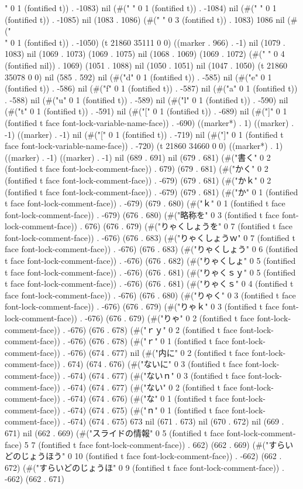 " 0 1 (fontified t)) . -1083) nil (#(" " 0 1 (fontified t)) . -1084) nil (#(" " 0 1 (fontified t)) . -1085) nil (1083 . 1086) (#("   " 0 3 (fontified t)) . 1083) 1086 nil (#("\\" 0 1 (fontified t)) . -1050) (t 21860 35111 0 0) ((marker . 966) . -1) nil (1079 . 1083) nil (1069 . 1073) (1069 . 1075) nil (1068 . 1069) (1069 . 1072) (#("    " 0 4 (fontified nil)) . 1069) (1051 . 1088) nil (1050 . 1051) nil (1047 . 1050) (t 21860 35078 0 0) nil (585 . 592) nil (#("d" 0 1 (fontified t)) . -585) nil (#("e" 0 1 (fontified t)) . -586) nil (#("f" 0 1 (fontified t)) . -587) nil (#("a" 0 1 (fontified t)) . -588) nil (#("u" 0 1 (fontified t)) . -589) nil (#("l" 0 1 (fontified t)) . -590) nil (#("t" 0 1 (fontified t)) . -591) nil (#("[" 0 1 (fontified t)) . -689) nil (#("]" 0 1 (fontified t face font-lock-variable-name-face)) . -690) ((marker*) . 1) ((marker) . -1) ((marker) . -1) nil (#("[" 0 1 (fontified t)) . -719) nil (#("]" 0 1 (fontified t face font-lock-variable-name-face)) . -720) (t 21860 34660 0 0) ((marker*) . 1) ((marker) . -1) ((marker) . -1) nil (689 . 691) nil (679 . 681) (#("書く" 0 2 (fontified t face font-lock-comment-face)) . 679) (679 . 681) (#("かく" 0 2 (fontified t face font-lock-comment-face)) . -679) (679 . 681) (#("かｋ" 0 2 (fontified t face font-lock-comment-face)) . -679) (679 . 681) (#("か" 0 1 (fontified t face font-lock-comment-face)) . -679) (679 . 680) (#("ｋ" 0 1 (fontified t face font-lock-comment-face)) . -679) (676 . 680) (#("略称を" 0 3 (fontified t face font-lock-comment-face)) . 676) (676 . 679) (#("りゃくしょうを" 0 7 (fontified t face font-lock-comment-face)) . -676) (676 . 683) (#("りゃくしょうｗ" 0 7 (fontified t face font-lock-comment-face)) . -676) (676 . 683) (#("りゃくしょう" 0 6 (fontified t face font-lock-comment-face)) . -676) (676 . 682) (#("りゃくしょ" 0 5 (fontified t face font-lock-comment-face)) . -676) (676 . 681) (#("りゃくｓｙ" 0 5 (fontified t face font-lock-comment-face)) . -676) (676 . 681) (#("りゃくｓ" 0 4 (fontified t face font-lock-comment-face)) . -676) (676 . 680) (#("りゃく" 0 3 (fontified t face font-lock-comment-face)) . -676) (676 . 679) (#("りゃｋ" 0 3 (fontified t face font-lock-comment-face)) . -676) (676 . 679) (#("りゃ" 0 2 (fontified t face font-lock-comment-face)) . -676) (676 . 678) (#("ｒｙ" 0 2 (fontified t face font-lock-comment-face)) . -676) (676 . 678) (#("ｒ" 0 1 (fontified t face font-lock-comment-face)) . -676) (674 . 677) nil (#("内に" 0 2 (fontified t face font-lock-comment-face)) . 674) (674 . 676) (#("ないに" 0 3 (fontified t face font-lock-comment-face)) . -674) (674 . 677) (#("ないｎ" 0 3 (fontified t face font-lock-comment-face)) . -674) (674 . 677) (#("ない" 0 2 (fontified t face font-lock-comment-face)) . -674) (674 . 676) (#("な" 0 1 (fontified t face font-lock-comment-face)) . -674) (674 . 675) (#("ｎ" 0 1 (fontified t face font-lock-comment-face)) . -674) (674 . 675) 673 nil (671 . 673) nil (670 . 672) nil (669 . 671) nil (662 . 669) (#("スライドの情報" 0 5 (fontified t face font-lock-comment-face) 5 7 (fontified t face font-lock-comment-face)) . 662) (662 . 669) (#("すらいどのじょうほう" 0 10 (fontified t face font-lock-comment-face)) . -662) (662 . 672) (#("すらいどのじょうほ" 0 9 (fontified t face font-lock-comment-face)) . -662) (662 . 671) 